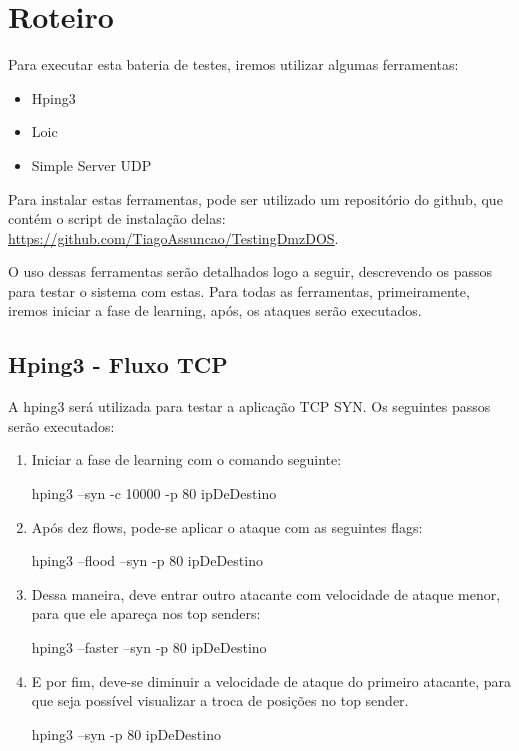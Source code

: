 \chapter[Roteiro]{Roteiro}

Para executar esta bateria de testes, iremos utilizar algumas ferramentas:

\begin{itemize}
    \item Hping3
    \item Loic
    \item Simple Server UDP
\end{itemize}

Para instalar estas ferramentas, pode ser utilizado um repositório do github,
que contém o script de instalação delas:
\hyperref[label_name]{https://github.com/TiagoAssuncao/TestingDmzDOS}.

O uso dessas ferramentas serão detalhados logo a seguir, descrevendo os passos para
testar o sistema com estas. Para todas as ferramentas, primeiramente, iremos
iniciar a fase de learning, após, os ataques serão executados.

\section{Hping3 - Fluxo TCP}
\label{sec:Hping3 - Fluxo TCP}
A hping3 será utilizada para testar a aplicação TCP SYN. Os seguintes passos
serão executados:

\begin{enumerate}
    \item Iniciar a fase de learning com o comando seguinte:

        hping3 --syn -c 10000 -p 80 ipDeDestino

    \item Após dez flows, pode-se aplicar o ataque com as seguintes flags:

        hping3 --flood --syn  -p 80 ipDeDestino

    \item Dessa maneira, deve entrar outro atacante com velocidade de ataque menor,
        para que ele apareça nos top senders:

        hping3 --faster --syn  -p 80 ipDeDestino

    \item E por fim, deve-se diminuir a velocidade de ataque do primeiro atacante,
        para que seja possível visualizar a troca de posições no top sender.

        hping3 --syn  -p 80 ipDeDestino
\end{enumerate}

